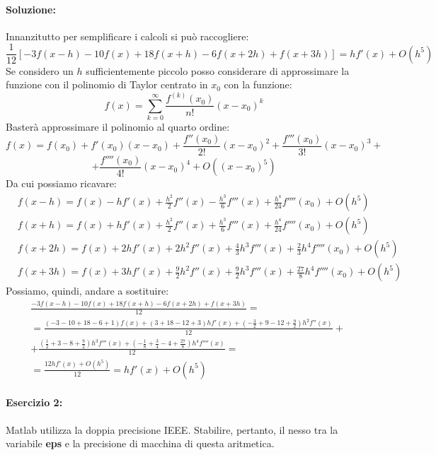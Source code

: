 \documentclass[12pt]{article}
\begin{document}
\paragraph{Soluzione:} 
Innanzitutto per semplificare i calcoli si può raccogliere: 
$$ \frac{1}{12}[-3f(x-h)-10f(x)+18f(x+h)-6f(x+2h)+f(x+3h)]=hf'(x) + O(h^5)$$
Se considero un \(h\) sufficientemente piccolo posso considerare di approssimare la funzione con il polinomio di Taylor
centrato in \(x_0\) con la funzione:
$$ f(x) = \sum_{k=0}^{\infty}{\frac{f^{(k)}(x_0)}{n!}(x-x_0)^k}$$
Basterà approssimare il polinomio al quarto ordine:
$$ f(x) = f(x_0) + f'(x_0)(x-x_0) + \frac{f''(x_0)}{2!}(x-x_0)^2+\frac{f'''(x_0)}{3!}(x-x_0)^3+$$
$$ + \frac{f''''(x_0)}{4!}(x-x_0)^4+O((x-x_0)^5)$$
Da cui possiamo ricavare:
\begin{equation}
    \begin{aligned}
        & f(x-h) = f(x) - hf'(x) + \frac{h^2}{2}f''(x)- \frac{h^3}{6}f'''(x)+ \frac{h^4}{24}f''''(x_0) + O(h^5)  \\
        & f(x+h) = f(x) + hf'(x) + \frac{h^2}{2}f''(x) + \frac{h^3}{6}f'''(x) + \frac{h^4}{24}f''''(x_0) + O(h^5)  \\
        & f(x+2h) = f(x) + 2hf'(x) + 2h^2f''(x)+ \frac{4}{3}h^3f'''(x)+ \frac{2}{3}h^4f''''(x_0) + O(h^5) \\
        & f(x+3h) = f(x) + 3hf'(x) + \frac{9}{2}h^2f''(x)+ \frac{9}{2}h^3f'''(x)+ \frac{27}{8}h^4f''''(x_0) + O(h^5)  
    \end{aligned}
\end{equation}
Possiamo, quindi, andare a sostituire:
\begin{equation}
    \begin{aligned}
        &\frac{-3f(x-h)-10f(x)+18f(x+h)-6f(x+2h)+f(x+3h)}{12}=\\
        &=\frac{(-3-10+18-6+1)f(x) + (3+18-12+3)hf'(x)+(-\frac{3}{2}+9-12+\frac{9}{2})h^2f''(x)}{12}+ \\
        &+ \frac{(\frac{1}{2}+ 3 -8 +\frac{9}{2})h^3f'''(x) + (-\frac{1}{8}+\frac{3}{4} -4 +\frac{27}{8})h^4f''''(x)}{12}=\\
        &=\frac{12hf'(x) + O(h^5)}{12} = hf'(x)+O(h^5)
    \end{aligned}
\end{equation}
\pagebreak
\paragraph{Esercizio 2:}
Matlab utilizza la doppia precisione IEEE. Stabilire, pertanto, il nesso tra la variabile
\textbf{eps} e la precisione di macchina di questa aritmetica.
\end{document}
